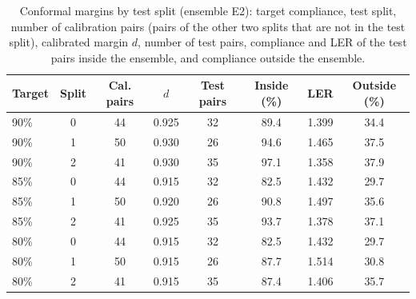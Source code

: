 \begin{table}[t]
\centering\small
\caption{Conformal margins by test split (ensemble E2): target compliance, test split, number of calibration pairs (pairs of the other two splits that are not in the test split), calibrated margin $d$, number of test pairs, compliance and LER of the test pairs inside the ensemble, and compliance outside the ensemble.}\label{tab:supconformal}
\begin{tabular}{lccccccc}
\toprule
Target & Split & Cal. pairs & $d$ & Test pairs & Inside (\%) & LER & Outside (\%)\\
\midrule
90\% & 0 & 44 & 0.925 & 32 & 89.4 & 1.399 & 34.4\\
90\% & 1 & 50 & 0.930 & 26 & 94.6 & 1.465 & 37.5\\
90\% & 2 & 41 & 0.930 & 35 & 97.1 & 1.358 & 37.9\\
85\% & 0 & 44 & 0.915 & 32 & 82.5 & 1.432 & 29.7\\
85\% & 1 & 50 & 0.920 & 26 & 90.8 & 1.497 & 35.6\\
85\% & 2 & 41 & 0.925 & 35 & 93.7 & 1.378 & 37.1\\
80\% & 0 & 44 & 0.915 & 32 & 82.5 & 1.432 & 29.7\\
80\% & 1 & 50 & 0.915 & 26 & 87.7 & 1.514 & 30.8\\
80\% & 2 & 41 & 0.915 & 35 & 87.4 & 1.406 & 35.7\\
\bottomrule
\end{tabular}
\end{table}
